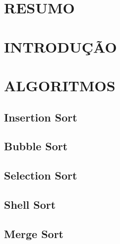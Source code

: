 \documentclass[12pt,a4paper]{article}
\begin{document}

\section{RESUMO}

\newpage


\tableofcontents
\newpage


\section{INTRODUÇÃO}

\newpage


\section{ALGORITMOS}

\subsection{Insertion Sort}


\subsection{Bubble Sort}


\subsection{Selection Sort}


\subsection{Shell Sort}


\subsection{Merge Sort}

\end{document}
